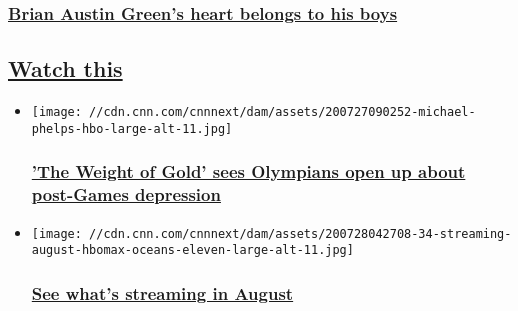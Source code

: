 \begin{itemize}
{  \subsubsection{\texorpdfstring{\href{/2020/08/05/entertainment/brian-austin-green-megan-fox-instagram/index.html}{Brian
  Austin Green's heart belongs to his
  boys}}{Brian Austin Green's heart belongs to his boys}}\label{brian-austin-greens-heart-belongs-to-his-boys}}
\end{itemize}

\hypertarget{watch-this-}{%
\subsection{\texorpdfstring{\href{http://www.cnn.com/entertainment/tv-shows}{Watch
this}~}{Watch this~}}\label{watch-this-}}

\begin{itemize}
\item
  \href{/2020/07/29/entertainment/the-weight-of-gold-review/index.html}{}

  \texttt{[image: //cdn.cnn.com/cnnnext/dam/assets/200727090252-michael-phelps-hbo-large-alt-11.jpg]}

  \hypertarget{the-weight-of-gold-sees-olympians-open-up-about-post-games-depression}{%
  \subsubsection{\texorpdfstring{\href{/2020/07/29/entertainment/the-weight-of-gold-review/index.html}{'The
  Weight of Gold' sees Olympians open up about post-Games
  depression}}{'The Weight of Gold' sees Olympians open up about post-Games depression}}\label{the-weight-of-gold-sees-olympians-open-up-about-post-games-depression}}
\end{itemize}

\begin{itemize}
\item
  \href{/2020/07/30/entertainment/netflix-hulu-amazon-august/index.html}{}

  \texttt{[image: //cdn.cnn.com/cnnnext/dam/assets/200728042708-34-streaming-august-hbomax-oceans-eleven-large-alt-11.jpg]}

  \hypertarget{see-whats-streaming-in-august}{%
  \subsubsection{\texorpdfstring{\href{/2020/07/30/entertainment/netflix-hulu-amazon-august/index.html}{See
  what's streaming in
  August}}{See what's streaming in August}}\label{see-whats-streaming-in-august}}
\end{itemize}

